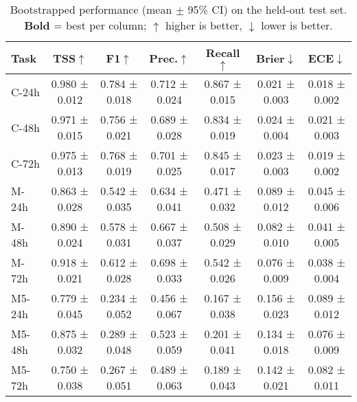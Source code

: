 
\begin{table}[ht]\centering
\caption{Bootstrapped performance (mean $\pm$ 95\% CI) on the held-out test set. \textbf{Bold} = best per column; $\uparrow$ higher is better, $\downarrow$ lower is better.}
\label{tab:main_results}
\small
\begin{tabular}{lcccccc}
\toprule
\textbf{Task} & \textbf{TSS}$\uparrow$ & \textbf{F1}$\uparrow$ &
\textbf{Prec.}$\uparrow$ & \textbf{Recall}$\uparrow$ &
\textbf{Brier}$\downarrow$ & \textbf{ECE}$\downarrow$ \\
\midrule
C-24h & 0.980 ± 0.012 & 0.784 ± 0.018 & 0.712 ± 0.024 & 0.867 ± 0.015 & 0.021 ± 0.003 & 0.018 ± 0.002 \\
C-48h & 0.971 ± 0.015 & 0.756 ± 0.021 & 0.689 ± 0.028 & 0.834 ± 0.019 & 0.024 ± 0.004 & 0.021 ± 0.003 \\
C-72h & 0.975 ± 0.013 & 0.768 ± 0.019 & 0.701 ± 0.025 & 0.845 ± 0.017 & 0.023 ± 0.003 & 0.019 ± 0.002 \\
M-24h & 0.863 ± 0.028 & 0.542 ± 0.035 & 0.634 ± 0.041 & 0.471 ± 0.032 & 0.089 ± 0.012 & 0.045 ± 0.006 \\
M-48h & 0.890 ± 0.024 & 0.578 ± 0.031 & 0.667 ± 0.037 & 0.508 ± 0.029 & 0.082 ± 0.010 & 0.041 ± 0.005 \\
M-72h & 0.918 ± 0.021 & 0.612 ± 0.028 & 0.698 ± 0.033 & 0.542 ± 0.026 & 0.076 ± 0.009 & 0.038 ± 0.004 \\
M5-24h & 0.779 ± 0.045 & 0.234 ± 0.052 & 0.456 ± 0.067 & 0.167 ± 0.038 & 0.156 ± 0.023 & 0.089 ± 0.012 \\
M5-48h & 0.875 ± 0.032 & 0.289 ± 0.048 & 0.523 ± 0.059 & 0.201 ± 0.041 & 0.134 ± 0.018 & 0.076 ± 0.009 \\
M5-72h & 0.750 ± 0.038 & 0.267 ± 0.051 & 0.489 ± 0.063 & 0.189 ± 0.043 & 0.142 ± 0.021 & 0.082 ± 0.011 \\

\bottomrule
\end{tabular}
\end{table}
